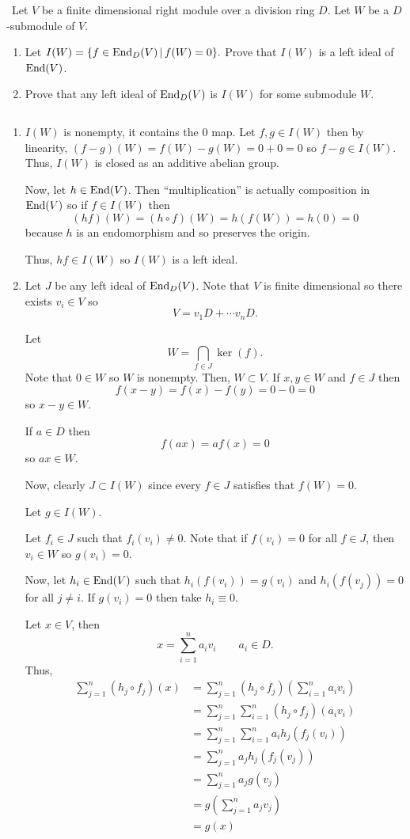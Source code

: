 \documentclass[12pt]{Qual}
\begin{document}
\newpage



\begin{problem} $\,$
Let $V$ be a finite dimensional right module over a division ring $D.$ Let $W$ be a $D$-submodule of $V$.
\begin{enumerate}[label=(\alph*)]
    \item Let $I(W)=\{f\in\text{End}_D(V)\,|\,f(W)=0\}.$ Prove that $I(W)$ is a left ideal of $\text{End}(V)$.
    \item Prove that any left ideal of $\text{End}_D(V)$ is $I(W)$ for some submodule $W$.
\end{enumerate}
\end{problem}


\begin{solution}$\,$
\begin{enumerate}[label=(\alph*)]
    \item  $I(W)$ is nonempty, it contains the $0$ map. Let $f,g\in I(W)$ then by linearity, $(f-g)(W)=f(W)-g(W)=0+0=0$ so $f-g\in I(W)$. Thus, $I(W)$ is closed as an additive abelian group.

    Now, let $h\in\text{End}(V)$. Then ``multiplication'' is actually composition in $\text{End}(V)$ so if $f\in I(W)$ then $$(hf)(W)=(h\circ f)(W)=h(f(W))=h(0)=0$$ because $h$ is an endomorphism and so preserves the origin.

    Thus, $hf\in I(W)$ so $I(W)$ is a left ideal.
    \item Let $J$ be any left ideal of $\text{End}_D(V)$. Note that $V$ is finite dimensional so there exists $v_i\in V$ so $$V=v_1D+\cdots v_nD.$$

    Let $$W=\bigcap_{f\in J}\ker(f).$$ Note that $0\in W$ so $W$ is nonempty. Then, $W\subset V.$ If $x,y\in W$ and $f\in J$ then $$f(x-y)=f(x)-f(y)=0-0=0$$ so $x-y\in W.$

    If $a\in D$ then $$f(ax)=af(x)=0$$ so $ax\in W.$

    Now, clearly $J\subset I(W)$ since every $f\in J$ satisfies that $f(W)=0.$

    Let $g\in I(W)$.

    Let $f_i\in J$ such that $f_i(v_i)\not=0.$ Note that if $f(v_i)=0$ for all $f\in J$, then $v_i\in W$ so $g(v_i)=0.$

    Now, let $h_i\in\text{End}(V)$ such that $h_i(f(v_i))=g(v_i)$ and $h_i(f(v_j))=0$ for all $j\not=i$. If $g(v_i)=0$ then take $h_i\equiv 0.$

    Let $x\in V$, then $$x=\sum_{i=1}^na_iv_i\qquad a_i\in D.$$ Thus, \begin{align*}
        \sum_{j=1}^n(h_j\circ f_j)(x)&=\sum_{j=1}^n\left(h_j\circ f_j\right)\left(\sum_{i=1}^na_iv_i\right)\\
        &=\sum_{j=1}^n\sum_{i=1}^n(h_j\circ f_j)(a_iv_i)\\
        &=\sum_{j=1}^n\sum_{i=1}^na_ih_j(f_j(v_i))\\
        &=\sum_{j=1}^na_jh_j(f_j(v_j))\\
        &=\sum_{j=1}^na_jg(v_j)\\
        &=g\left(\sum_{j=1}^na_jv_j\right)\\
        &=g(x)
    \end{align*}


\end{enumerate}
\end{solution}
\end{document}
